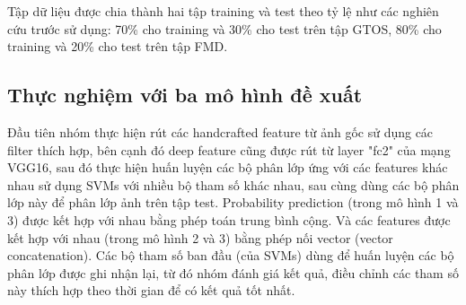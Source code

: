 Tập dữ liệu được chia thành hai tập training và test theo tỷ lệ như các nghiên cứu trước sử dụng: 70\% cho training và 30\% cho test trên tập GTOS, 80\% cho training và 20\% cho test trên tập FMD.

\subsection*{Thực nghiệm với ba mô hình đề xuất}
Đầu tiên nhóm thực hiện rút các handcrafted feature từ ảnh gốc sử dụng các filter thích hợp, bên cạnh đó deep feature cũng được rút từ layer "fc2" của mạng VGG16, sau đó thực hiện huấn luyện các bộ phân lớp ứng với các features khác nhau sử dụng SVMs với nhiều bộ tham số khác nhau, sau cùng dùng các bộ phân lớp này để phân lớp ảnh trên tập test. Probability prediction (trong mô hình 1 và 3) được kết hợp với nhau bằng phép toán trung bình cộng. Và các features được kết hợp với nhau (trong mô hình 2 và 3) bằng phép nối vector (vector concatenation). Các bộ tham số ban đầu (của SVMs) dùng để huấn luyện các bộ phân lớp được ghi nhận lại, từ đó nhóm đánh giá kết quả, điều chỉnh các tham số này thích hợp theo thời gian để có kết quả tốt nhất.

\begin{table}[h!]
  \label{tab:gtos_evaluation}
  \begin{center}
    \captionsetup{width=0.9\textwidth}
    \caption{Kết quả thực nghiệm với các mô hình trên tập GTOS}
  \end{center}
\end{table}

